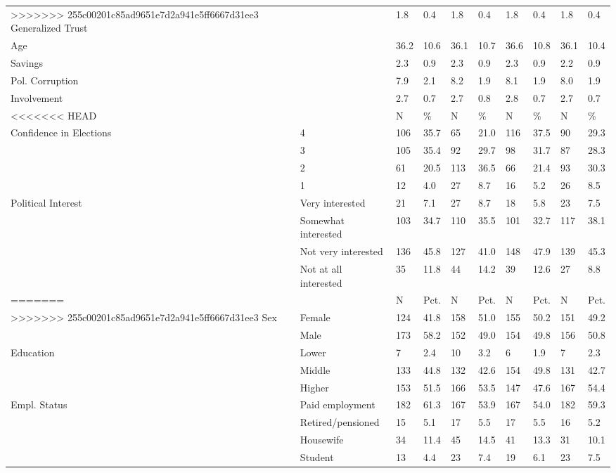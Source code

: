\begin{table}
\begin{tabular}[t]{llllllllll}
>>>>>>> 255c00201c85ad9651e7d2a941e5ff6667d31ee3
Generalized Trust &  & 1.8 & 0.4 & 1.8 & 0.4 & 1.8 & 0.4 & 1.8 & 0.4\\
Age &  & 36.2 & 10.6 & 36.1 & 10.7 & 36.6 & 10.8 & 36.1 & 10.4\\
Savings &  & 2.3 & 0.9 & 2.3 & 0.9 & 2.3 & 0.9 & 2.2 & 0.9\\
Pol. Corruption &  & 7.9 & 2.1 & 8.2 & 1.9 & 8.1 & 1.9 & 8.0 & 1.9\\
Involvement &  & 2.7 & 0.7 & 2.7 & 0.8 & 2.8 & 0.7 & 2.7 & 0.7\\
\midrule
<<<<<<< HEAD
 &  & N & \% & N & \% & N & \% & N & \%\\
Confidence in Elections & 4 & 106 & 35.7 & 65 & 21.0 & 116 & 37.5 & 90 & 29.3\\
 & 3 & 105 & 35.4 & 92 & 29.7 & 98 & 31.7 & 87 & 28.3\\
 & 2 & 61 & 20.5 & 113 & 36.5 & 66 & 21.4 & 93 & 30.3\\
 & 1 & 12 & 4.0 & 27 & 8.7 & 16 & 5.2 & 26 & 8.5\\
Political Interest & Very interested & 21 & 7.1 & 27 & 8.7 & 18 & 5.8 & 23 & 7.5\\
 & Somewhat interested & 103 & 34.7 & 110 & 35.5 & 101 & 32.7 & 117 & 38.1\\
 & Not very interested & 136 & 45.8 & 127 & 41.0 & 148 & 47.9 & 139 & 45.3\\
 & Not at all interested & 35 & 11.8 & 44 & 14.2 & 39 & 12.6 & 27 & 8.8\\
=======
 &  & N & Pct. & N & Pct. & N & Pct. & N & Pct.\\
>>>>>>> 255c00201c85ad9651e7d2a941e5ff6667d31ee3
Sex & Female & 124 & 41.8 & 158 & 51.0 & 155 & 50.2 & 151 & 49.2\\
 & Male & 173 & 58.2 & 152 & 49.0 & 154 & 49.8 & 156 & 50.8\\
Education & Lower & 7 & 2.4 & 10 & 3.2 & 6 & 1.9 & 7 & 2.3\\
 & Middle & 133 & 44.8 & 132 & 42.6 & 154 & 49.8 & 131 & 42.7\\
 & Higher & 153 & 51.5 & 166 & 53.5 & 147 & 47.6 & 167 & 54.4\\
Empl. Status & Paid employment & 182 & 61.3 & 167 & 53.9 & 167 & 54.0 & 182 & 59.3\\
 & Retired/pensioned & 15 & 5.1 & 17 & 5.5 & 17 & 5.5 & 16 & 5.2\\
 & Housewife & 34 & 11.4 & 45 & 14.5 & 41 & 13.3 & 31 & 10.1\\
 & Student & 13 & 4.4 & 23 & 7.4 & 19 & 6.1 & 23 & 7.5\\

\end{tabular}
\end{table}
